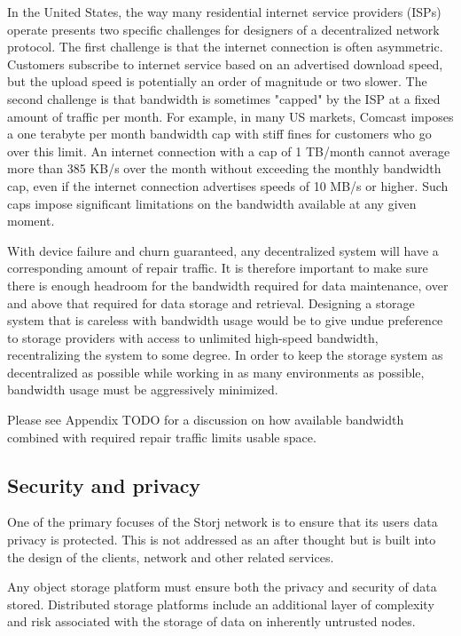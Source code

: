 \documentclass[a4paper,10pt]{article} \usepackage[utf8]{inputenc}
\newcommand{\todo}[1]{{\color{red} TODO #1 }}
\begin{document}
In the United States, the way many residential internet service providers (ISPs)
operate presents two specific challenges for designers of a
decentralized network protocol. The first challenge is that the internet
connection is often asymmetric. Customers subscribe to internet service
based on an advertised download speed, but the upload speed is potentially an
order of magnitude or two slower. The second challenge is that bandwidth is
sometimes "capped" by the ISP at a fixed amount of traffic per month.
For example, in many
US markets, Comcast imposes a one terabyte per month bandwidth cap with stiff
fines for customers who go over this limit.
An internet connection with a cap of 1 TB/month cannot average more than
385 KB/s over the month without exceeding the monthly bandwidth cap, even if
the internet connection advertises speeds of 10 MB/s or higher.
Such caps impose
significant limitations on the bandwidth available at any given moment.

With device failure and churn guaranteed, any decentralized system will have a
corresponding amount of repair traffic. It is therefore important to make sure
there is enough headroom for the bandwidth required for data maintenance, over
and above that required for data storage and retrieval. Designing a
storage system that is careless with bandwidth usage would be to give undue
preference to storage providers with access to unlimited high-speed bandwidth,
recentralizing the system to some degree. In order to keep the storage
system as decentralized as possible while working in as many environments
as possible, bandwidth usage must be aggressively minimized.

Please see Appendix \todo{} for a discussion on how available bandwidth
combined with required repair traffic limits usable space.

\subsection{Security and privacy}
One of the primary focuses of the Storj network is to ensure that its users data privacy is protected. This is not addressed as an after thought but is built into the design of the clients, network and other related services.

Any object storage platform must ensure both the privacy and security of data
stored. Distributed storage platforms include an additional layer of
complexity and risk associated with the storage of data on inherently
untrusted nodes.
\end{document}
